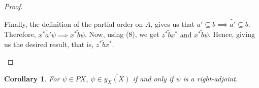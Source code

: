 \documentclass[a4paper]{article}
\newtheorem{coro}[theorem]{Corollary}
\theoremstyle{definition}
\newtheorem{lemma}[theorem]{Lemma}
\begin{document}
\begin{proof}
\begin{enumerate}[label=(\alph*)]
				Finally, the definition of the partial order on $\tilde{A}$,
				gives us that $a' \subseteq b \implies \tilde{a'}
				\subseteq \tilde{b} $. Therefore,  $x^* \tilde{a'}\psi \implies x^* \tilde{b}\psi$.
				Now, using (8), we get $z^* \tilde{b}x^* \text{ and } x^*\tilde{b}\psi  $. Hence, giving us the desired result, that is, $z^* \tilde{b} x^* $. \qedhere
		\end{enumerate}
	\end{proof}
	\begin{coro}
		For $\psi \in PX$, $\psi \in \overline{y_X(X)}$ if and only if $\psi$ is a right-adjoint.
	\end{coro}
\end{document}
